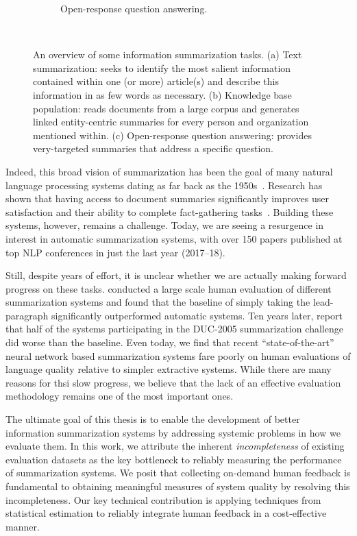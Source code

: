 \begin{figure}
\begin{subfigure}{0.55\textwidth}
    \caption{\label{fig:intro:overview-qa} Open-response question answering.}
  \end{subfigure} \\

  \caption[Overview of some information summarization tasks]{\label{fig:intro:overview} An overview of some information summarization tasks.
  (a) Text summarization: seeks to identify the most salient information contained within one (or more) article(s) and describe this information in as few words as necessary.
  (b) Knowledge base population: reads documents from a large corpus and generates linked entity-centric summaries for every person and organization mentioned within.
  (c) Open-response question answering: provides very-targeted summaries that address a specific question.
  }
\end{figure}

Indeed, this broad vision of summarization has been the goal of many natural language processing systems dating as far back as the 1950s~\citep{luhn1958automatic}.
Research has shown that having access to document summaries significantly improves user satisfaction and their ability to complete fact-gathering tasks~\citep{mani1999tipster, mckeown2005summaries}. 
Building these systems, however, remains a challenge.
Today, we are seeing a resurgence in interest in automatic summarization systems, with over 150 papers published at top NLP conferences in just the last year (2017--18).

Still, despite years of effort, it is unclear whether we are actually making forward progress on these tasks.
\citet{brandow1995automatic} conducted a large scale human evaluation of different summarization systems and found that the baseline of simply taking the lead-paragraph significantly outperformed automatic systems. 
Ten years later, \citet{passonneau2005applying} report that half of the systems participating in the DUC-2005 summarization challenge did worse than the baseline.
Even today, we find that recent ``state-of-the-art'' neural network based summarization systems fare poorly on human evaluations of language quality relative to simpler extractive systems.
While there are many reasons for thsi slow progress, we believe that the lack of an effective evaluation methodology remains one of the most important ones.

The ultimate goal of this thesis is to enable the development of better information summarization systems by addressing systemic problems in how we evaluate them.
In this work, we attribute the inherent \textit{incompleteness} of existing evaluation datasets as the key bottleneck to reliably measuring the performance of summarization systems.
We posit that collecting on-demand human feedback is fundamental to obtaining meaningful measures of system quality by resolving this incompleteness.
Our key technical contribution is applying techniques from statistical estimation to reliably integrate human feedback in a cost-effective manner.

